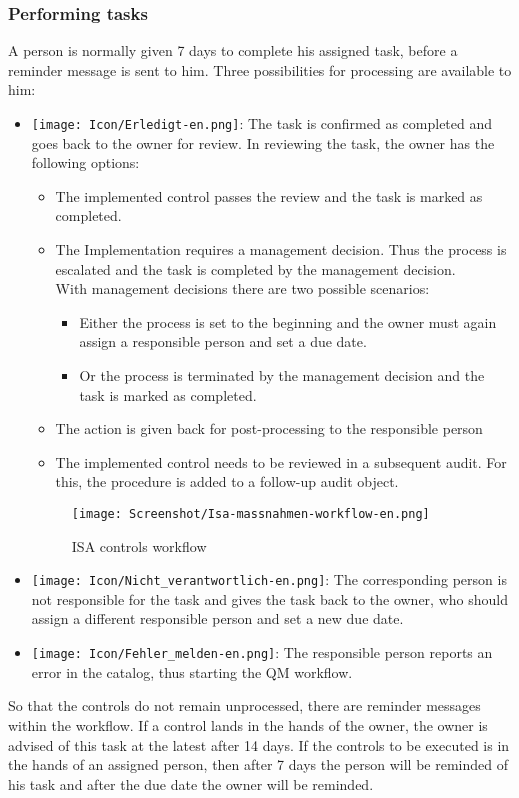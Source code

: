 \documentclass[a4paper,10pt]{book}
\begin{document}
\subsubsection{Performing tasks}
A person is normally given 7 days to complete his assigned task, before a reminder message is sent to him. Three possibilities for processing are available to him:
\begin{itemize}
\item \texttt{[image: Icon/Erledigt-en.png]}: The task is confirmed as completed and goes back to the owner for review. In reviewing the task, the owner has the following options:
  \begin{itemize}
   \item The implemented control passes the review and the task is marked as completed.
   \item The Implementation requires a management decision. Thus the process is escalated and the task is completed by the management decision.
\newline\\
With management decisions there are two possible scenarios:
\begin{itemize}
 \item Either the process is set to the beginning and the owner must again assign a responsible person and set a due date.
 \item Or the process is terminated by the management decision and the task is marked as completed.
\end{itemize}
   \item The action is given back for post-processing to the responsible person
   \item The implemented control needs to be reviewed in a subsequent audit. For this, the procedure is added to a follow-up audit object.
  \end{itemize}
  \begin{figure}[htb!]
  \centering
  \texttt{[image: Screenshot/Isa-massnahmen-workflow-en.png]}
  \caption{\label{ISA controls workflow} ISA controls workflow}
\end{figure}

\item \texttt{[image: Icon/Nicht\_verantwortlich-en.png]}: The corresponding person is not responsible for the task and gives the task back to the owner, who should assign a different responsible person and set a new due date.
\item \texttt{[image: Icon/Fehler\_melden-en.png]}: The responsible person reports an error in the catalog, thus starting the QM workflow.
\end{itemize}
So that the controls do not remain unprocessed, there are reminder messages within the workflow. If a control lands in the hands of the owner, the owner is advised of this task at the latest after 14 days. If the controls to be executed is in the hands of an assigned person, then after 7 days the person will be reminded of his task and after the due date the owner will be reminded.
\end{document}
